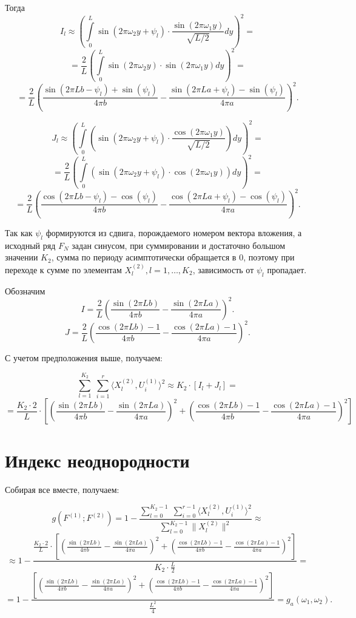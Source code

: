 \documentclass[specialist, substylefile = spbu.rtx,
			   subf, href, 12pt]{disser}
\begin{document}
Тогда
$$ I_l \approx \left( \int\limits_{0}^{L}\sin(2\pi\omega_2 y + \psi_l) \cdot \frac{\sin(2\pi\omega_1 y)}{\sqrt{L/2}}dy \right)^2 = $$
$$ = \frac{2}{L} \left(\int\limits_{0}^{L}\sin(2\pi\omega_2 y) \cdot \sin(2\pi\omega_1 y)dy\right )^2 = $$
$$ = \frac{2}{L} 
\left(  
\frac{\sin(2\pi Lb - \psi_l) + \sin(\psi_l)}{4\pi b} - \frac{\sin(2\pi La + \psi_l) - \sin(\psi_l)}{4\pi a}
\right)^2. $$



$$ J_l \approx \left(\int\limits_{0}^{L}(\sin(2\pi\omega_2 y + \psi_l) \cdot \frac{\cos(2\pi\omega_1 y)}{\sqrt{L/2}})dy\right)^2 = $$
$$ = \frac{2}{L}\left(\int\limits_{0}^{L}(\sin(2\pi\omega_2 y + \psi_l) \cdot\cos(2\pi\omega_1 y))dy\right )^2 = $$
$$ = \frac{2}{L} 
\left(  
\frac{\cos(2\pi Lb - \psi_l) - \cos(\psi_l)}{4\pi b} - \frac{\cos(2\pi La + \psi_l) - \cos(\psi_l)}{4\pi a}
\right)^2. $$


Так как $ \psi_l $ формируются из сдвига, порождаемого номером вектора вложения, а исходный ряд $ F_N $ задан синусом, при суммировании и достаточно большом значении $ K_2 $, сумма по периоду асимптотически обращается в $ 0 $, поэтому при переходе к сумме по элементам $ X_l^{(2)}, l=1, \dots, K_2 $, зависимость от $ \psi_l $ пропадает.

Обозначим
$$ I = \frac{2}{L} \left(  \frac{\sin(2\pi Lb)}{4\pi b} - \frac{\sin(2\pi La)}{4\pi a}   \right)^2. $$
$$ J = \frac{2}{L} \left(  \frac{\cos(2\pi Lb) - 1}{4\pi b} - \frac{\cos(2\pi La) - 1}{4\pi a}  \right)^2. $$


С учетом предположения выше, получаем:

$$ \sum\limits_{l=1}^{K_2}\;\sum\limits_{i=1}^{r}\langle X_l^{(2)}, U_i^{(1)}\rangle^2 \approx K_2 \cdot \left [ I_l + J_l \right] = $$
$$ = \frac{K_2 \cdot 2}{L} \cdot \left[ \left(  \frac{\sin(2\pi Lb)}{4\pi b} - \frac{\sin(2\pi La)}{4\pi a}   \right)^2 + \left(  \frac{\cos(2\pi Lb) - 1}{4\pi b} - \frac{\cos(2\pi La) - 1}{4\pi a}  \right)^2 \right] $$


\section{Индекс неоднородности}
Собирая все вместе, получаем:

$$ g(F^{(1)}; F^{(2)}) = 1 - \frac{\sum\limits_{l=0}^{K_2-1}\;\sum\limits_{i=0}^{r-1}\langle X_l^{(2)}, U_i^{(1)}\rangle^2}{\sum\limits_{l=0}^{K_2-1}\|X_l^{(2)}\|^2} \approx $$
$$ \approx 1 - \frac{\frac{K_2 \cdot 2}{L} \cdot \left[ \left(  \frac{\sin(2\pi Lb)}{4\pi b} - \frac{\sin(2\pi La)}{4\pi a}   \right)^2 + \left(  \frac{\cos(2\pi Lb) - 1}{4\pi b} - \frac{\cos(2\pi La) - 1}{4\pi a}  \right)^2 \right]}{K_2\cdot\frac{L}{2}} = $$
\begin{equation}\label{eq:g_a}
	= 1 - \frac{\left[ \left(  \frac{\sin(2\pi Lb)}{4\pi b} - \frac{\sin(2\pi La)}{4\pi a}   \right)^2 + \left(  \frac{\cos(2\pi Lb) - 1}{4\pi b} - \frac{\cos(2\pi La) - 1}{4\pi a}  \right)^2 \right]}{\frac{L^2}{4}} = g_a(\omega_1, \omega_2).
\end{equation}
\end{document}
